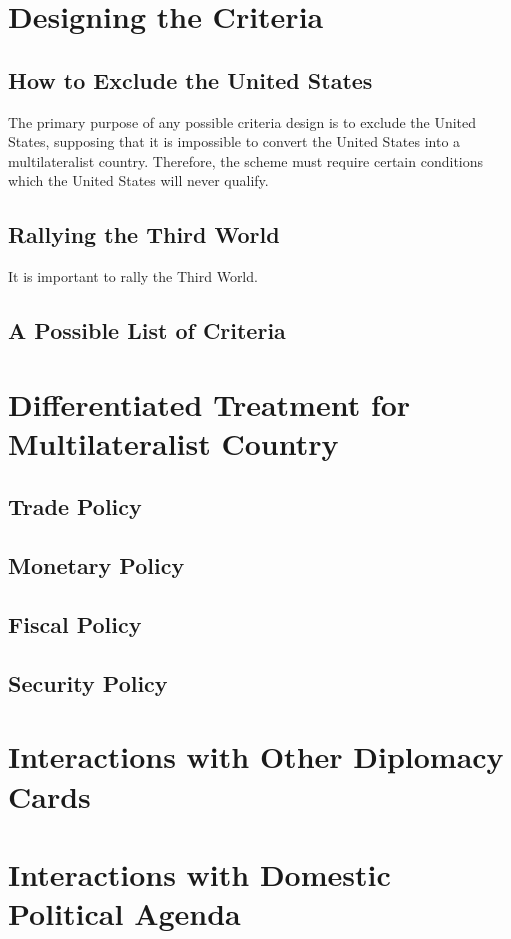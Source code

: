 
\section{Designing the Criteria}

\subsection{How to Exclude the United States}

The primary purpose of any possible criteria design is to exclude the United States, supposing that it is impossible to convert the United States into a multilateralist country. Therefore, the scheme must require certain conditions which the United States will never qualify.

\subsection{Rallying the Third World}

It is important to rally the Third World.

\subsection{A Possible List of Criteria}

\section{Differentiated Treatment for Multilateralist Country}

\subsection{Trade Policy}

\subsection{Monetary Policy}

\subsection{Fiscal Policy}

\subsection{Security Policy}

\section{Interactions with Other Diplomacy Cards}

\section{Interactions with Domestic Political Agenda}




